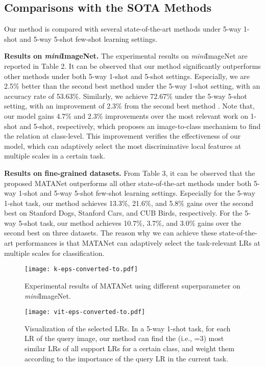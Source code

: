 \documentclass[final]{cvpr}
\begin{document}
	
	\subsection{Comparisons with the SOTA Methods}
	Our method is compared with several state-of-the-art methods under 5-way 1-shot and 5-way 5-shot few-shot learning settings.
	
	\textbf{Results on \emph{mini}ImageNet.} The experimental results on \emph{mini}ImageNet are reported in Table 2.  It can be observed that our method significantly outperforms other methods under both 5-way 1-shot and 5-shot settings. 
	Especially, we are 2.5\% better than the second best method \cite{flennerhag2019meta} under the 5-way 1-shot setting, with an accuracy rate of 53.63\%.  Similarly, we achieve 72.67\% under the 5-way 5-shot setting, with an improvement of 2.3\% from the second best method \cite{li2019revisiting}. Note that, our model gains 4.7\% and 2.3\% improvements over the most relevant work \cite{li2019revisiting} on 1-shot and 5-shot, respectively, which proposes an image-to-class mechanism to find the relation at class-level. This improvement verifies the effectiveness of our model, which can adaptively select the most discriminative local features at multiple scales in a certain task.
	
	\textbf{Results on fine-grained datasets.} From Table 3, it can be observed that the proposed MATANet outperforms all other state-of-the-art methods under both 5-way 1-shot and 5-way 5-shot few-shot learning settings. 
	Especially for the 5-way 1-shot task, our method achieves 13.3\%, 21.6\%, and 5.8\% gains over the second best on Stanford Dogs, Stanford Cars, and CUB Birds, respectively. For the 5-way 5-shot task, our method achieves 10.7\%, 3.7\%, and 3.0\% gains over the second best on three datasets.
	The reason why we can achieve these state-of-the-art performances is that MATANet can adaptively select the task-relevant LRs at multiple scales for classification. 

		\begin{figure}[t]
		\centering
		\texttt{[image: k-eps-converted-to.pdf]}
		\caption{Experimental results of MATANet using different superparameter  on \emph{mini}ImageNet. }
		\label{influence k}
	\end{figure}
	\begin{figure*}[t]
		\centering
		\texttt{[image: vit-eps-converted-to.pdf]}
		\caption{Visualization of the selected LRs. In a 5-way 1-shot task, for each LR of the query image, our method can find the  (i.e., =3) most similar LRs of all support LRs for a certain class, and weight them according to the importance of the query LR in the current task. }
		\label{k}
	\end{figure*}
\end{document}
